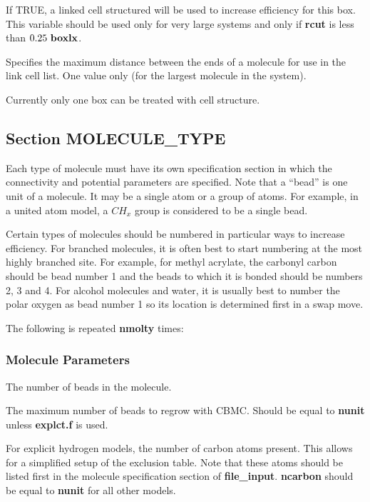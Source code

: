 \documentclass[12pt,letterpaper]{article}
\begin{document}
 If TRUE, a linked cell
structured will be used to increase efficiency for this box.
This variable should be used only for very large systems and
only if {\bf rcut} is less than $0.25~{\bf boxlx}$.

 Specifies the maximum distance
between the ends of a molecule for use in the link cell
list. One value only (for the largest molecule in the
system).

Currently only one box can be treated with cell structure.

\subsection{Section \textbf{MOLECULE\_TYPE}}
Each type of molecule must have its own specification
section in which the connectivity and potential parameters
are specified. Note that a ``bead'' is one unit of a
molecule. It may be a single atom or a group of atoms. For
example, in a united atom model, a $CH_x$ group is
considered to be a single bead.

Certain types of molecules should be numbered in particular
ways to increase efficiency. For branched molecules, it is
often best to start numbering at the most highly branched
site. For example, for methyl acrylate, the carbonyl carbon
should be bead number 1 and the beads to which it is bonded
should be numbers 2, 3 and 4. For alcohol molecules and
water, it is usually best to number the polar oxygen as bead
number 1 so its location is determined first in a swap move.

The following is repeated {\bf nmolty} times:

\subsubsection{Molecule Parameters}

 The number of beads in the molecule.

 The maximum number of beads to regrow
with CBMC. Should be equal to {\bf nunit} unless {\bf
  explct.f} is used.

 For explicit hydrogen models, the
number of carbon atoms present. This allows for a simplified
setup of the exclusion table. Note that these atoms should
be listed first in the molecule specification section of
{\bf file\_input}. {\bf ncarbon} should be equal to {\bf
  nunit} for all other models.
\end{document}
